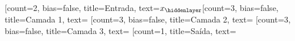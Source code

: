 \documentclass{standalone}
\begin{document}
\begin{neuralnetwork}[height=3]
		\newcommand{\nodetextx}[2]{$x_{#2}$}
		\newcommand{\nodenone}[2]{} 
		[count=2, bias=false, title=Entrada, text=\nodetextx]  
		\hiddenlayer[count=3, bias=false, title=Camada 1, text=\nodenone] \linklayers 
		\hiddenlayer[count=3, bias=false, title=Camada 2, text=\nodenone] \linklayers 
		\hiddenlayer[count=3, bias=false, title=Camada 3, text=\nodenone] \linklayers 
		\outputlayer[count=1, title=Saída, text=\nodenone] \linklayers 
\end{neuralnetwork}
\end{document}
